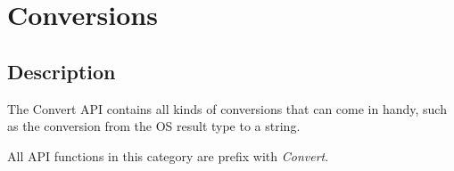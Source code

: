 \chapter{Conversions}

\section{Description}
The Convert API contains all kinds of conversions that can come in handy, such as the conversion from the OS result type to a string.

All API functions in this category are prefix with \textit{Convert}.

